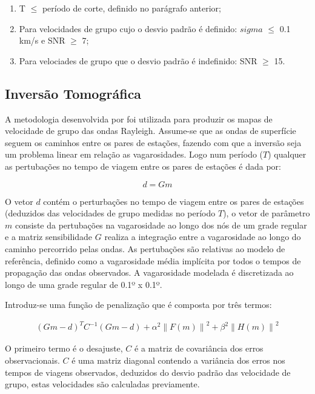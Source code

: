 \begin{enumerate}
\item T $\leq$ período de corte, definido no parágrafo anterior;

\item Para velocidades de grupo cujo o desvio padrão é definido: $sigma$ $\leq$ 0.1 km/s e SNR $\geq$ 7;

\item Para velociades de grupo que o desvio padrão é indefinido: SNR $\geq$ 15.
\end{enumerate}

\subsection{Inversão Tomográfica}

A metodologia desenvolvida por  \cite{barmin_fast_2001} foi utilizada para produzir os mapas de velocidade de grupo das ondas Rayleigh. Assume-se que as ondas de superfície seguem os caminhos entre os pares de estações, fazendo com que a inversão seja um problema linear em relação as vagarosidades. Logo num período ($T$) qualquer as pertubações no tempo de viagem entre os pares de estações é dada por:

\begin{equation}
d=Gm
\end{equation} 

O vetor $d$ contém o perturbações no tempo de viagem entre os pares de estações (deduzidos das velocidades de grupo medidas no período $T$), o vetor de parâmetro $m$ consiste da pertubações na vagarosidade ao longo dos nós de um grade regular e a matriz sensibilidade $G$ realiza a integração entre a vagarosidade ao longo do caminho percorrido pelas ondas. As pertubações são relativas ao modelo de referência, definido como a vagarosidade média implícita por todos o tempos de propagação das ondas observados. A vagarosidade modelada é discretizada ao longo de uma grade regular de 0.1º x 0.1º. 

Introduz-se uma função de penalização que é composta por três termos:

\begin{eqnarray}
(Gm-d)^{T}C^{-1}(Gm-d) + \alpha ^{2} \left \| F(m)  \right \| ^{2} + \beta ^{2 } \left \| H(m)  \right \| ^{2}
\end{eqnarray}

O primeiro termo é o desajuste, $C$ é a matriz de covariância dos erros observacionais. $C$ é uma matriz diagonal contendo a variância dos erros nos tempos de viagens observados, deduzidos do desvio padrão das velocidade de grupo, estas velocidades são calculadas previamente. 

